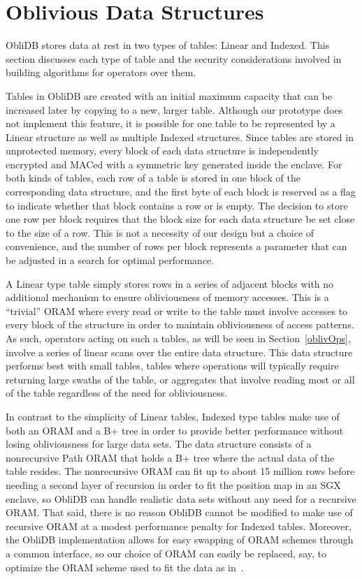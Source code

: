 \documentclass[letterpaper,twocolumn,10pt]{article}
\def\name/{ObliDB}
\begin{document}
\section{Oblivious Data Structures}\label{oblivData}
\name/ stores data at rest in two types of tables: Linear and Indexed. This section discusses each type of table and the security considerations involved in building algorithms for operators over them. 

Tables in \name/ are created with an initial maximum capacity that can be increased later by copying to a new, larger table. Although our prototype does not implement this feature, it is possible for one table to be represented by a Linear structure as well as multiple Indexed structures. Since tables are stored in unprotected memory, every block of each data structure is independently encrypted and MACed with a symmetric key generated inside the enclave. For both kinds of tables, each row of a table is stored in one block of the corresponding data structure, and the first byte of each block is reserved as a flag to indicate whether that block contains a row or is empty. The decision to store one row per block requires that the block size for each data structure be set close to the size of a row. This is not a necessity of our design but a choice of convenience, and the number of rows per block represents a parameter that can be adjusted in a search for optimal performance.

A Linear type table simply stores rows in a series of adjacent blocks with no additional mechanism to ensure obliviousness of memory accesses. This is a ``trivial'' ORAM where every read or write to the table must involve accesses to every block of the structure in order to maintain obliviousness of access patterns. As such, operators acting on such a tables, as will be seen in Section~\ref{oblivOps}, involve a series of linear scans over the entire data structure. This data structure performs best with small tables, tables where operations will typically require returning large swaths of the table, or aggregates that involve reading most or all of the table regardless of the need for obliviousness.

In contrast to the simplicity of Linear tables, Indexed type tables make use of both an ORAM and a B+ tree in order to provide better performance without losing obliviousness for large data sets. The data structure consists of a nonrecursive Path ORAM that holds a B+ tree where the actual data of the table resides. The nonrecursive ORAM can fit up to about 15 million rows before needing a second layer of recursion in order to fit the position map in an SGX enclave, so \name/ can handle realistic data sets without any need for a recursive ORAM. That said, there is no reason \name/ cannot be modified to make use of recursive ORAM at a modest performance penalty for Indexed tables. Moreover, the \name/ implementation allows for easy swapping of ORAM schemes through a common interface, so our choice of ORAM can easily be replaced, say, to optimize the ORAM scheme used to fit the data as in~\cite{ZWR+16}.
\end{document}
